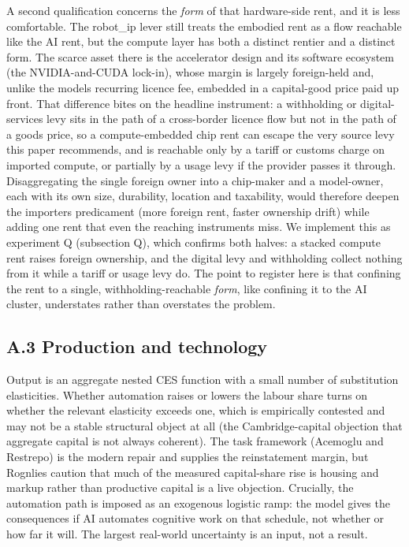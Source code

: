 \documentclass[12pt]{article}
\begin{document}
A second qualification concerns the \emph{form} of that hardware-side
rent, and it is less comfortable. The robot\_ip lever still treats the
embodied rent as a flow reachable like the AI rent, but the compute
layer has both a distinct rentier and a distinct form. The scarce asset
there is the accelerator design and its software ecosystem (the
NVIDIA-and-CUDA lock-in), whose margin is largely foreign-held and,
unlike the model\textquotesingle s recurring licence fee, embedded in a
capital-good price paid up front. That difference bites on the headline
instrument: a withholding or digital-services levy sits in the path of a
cross-border licence flow but not in the path of a goods price, so a
compute-embedded chip rent can escape the very source levy this paper
recommends, and is reachable only by a tariff or customs charge on
imported compute, or partially by a usage levy if the provider passes it
through. Disaggregating the single foreign owner into a chip-maker and a
model-owner, each with its own size, durability, location and
taxability, would therefore deepen the importer\textquotesingle s
predicament (more foreign rent, faster ownership drift) while adding one
rent that even the reaching instruments miss. We implement this as
experiment Q (subsection Q), which confirms both halves: a stacked
compute rent raises foreign ownership, and the digital levy and
withholding collect nothing from it while a tariff or usage levy do. The
point to register here is that confining the rent to a single,
withholding-reachable \emph{form}, like confining it to the AI cluster,
understates rather than overstates the problem.

\hypertarget{a.3-production-and-technology}{%
\subsection{A.3 Production and
technology}\label{a.3-production-and-technology}}

Output is an aggregate nested CES function with a small number of
substitution elasticities. Whether automation raises or lowers the
labour share turns on whether the relevant elasticity exceeds one, which
is empirically contested and may not be a stable structural object at
all (the Cambridge-capital objection that aggregate capital is not
always coherent). The task framework (Acemoglu and Restrepo) is the
modern repair and supplies the reinstatement margin, but
Rognlie\textquotesingle s caution that much of the measured
capital-share rise is housing and markup rather than productive capital
is a live objection. Crucially, the automation path is imposed as an
exogenous logistic ramp: the model gives the consequences if AI
automates cognitive work on that schedule, not whether or how far it
will. The largest real-world uncertainty is an input, not a result.
\end{document}
